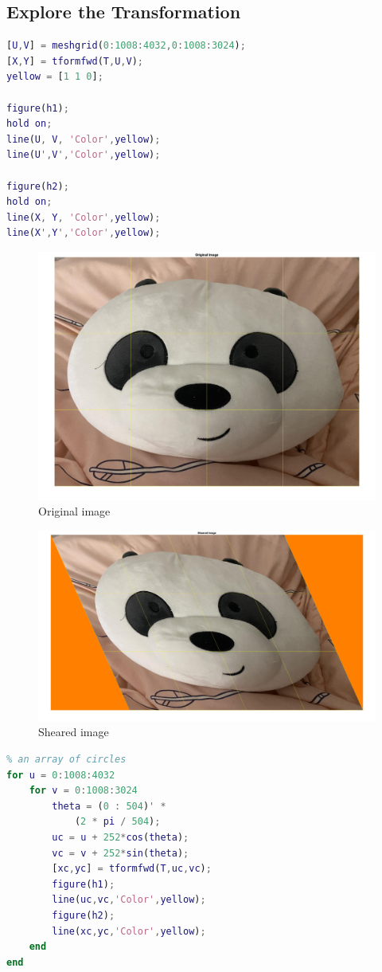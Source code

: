 \documentclass[conference]{IEEEtran}
\begin{document}
\subsection{Explore the Transformation}
\begin{lstlisting}[language=Matlab]
% Step 2: Explore the Transformation
[U,V] = meshgrid(0:1008:4032,0:1008:3024);
[X,Y] = tformfwd(T,U,V);
yellow = [1 1 0];

figure(h1);
hold on;
line(U, V, 'Color',yellow);
line(U',V','Color',yellow);

figure(h2);
hold on;
line(X, Y, 'Color',yellow);
line(X',Y','Color',yellow);
\end{lstlisting}

\begin{figure}[h!]
\centering
\includegraphics[width=0.8\linewidth]{images/img27.jpg}
\caption{Original image}
\label{fig:oi}
\end{figure}

\begin{figure}[h!]
\centering
\includegraphics[width=0.8\linewidth]{images/img28.jpg}
\caption{Sheared image}
\label{fig:si}
\end{figure}

\begin{lstlisting}[language=Matlab]
% Do the same thing with 
% an array of circles
for u = 0:1008:4032
    for v = 0:1008:3024
        theta = (0 : 504)' * 
            (2 * pi / 504);
        uc = u + 252*cos(theta);
        vc = v + 252*sin(theta);
        [xc,yc] = tformfwd(T,uc,vc);
        figure(h1); 
        line(uc,vc,'Color',yellow);
        figure(h2); 
        line(xc,yc,'Color',yellow);
    end
end
\end{lstlisting}
\end{document}
